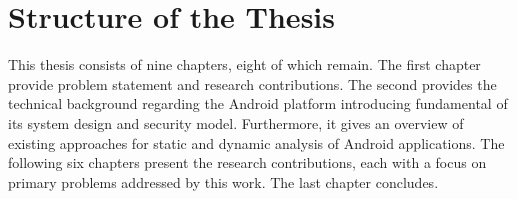 

\section{Structure of the Thesis}

This thesis consists of nine chapters, eight of which remain. The first chapter provide problem statement and research contributions. The second provides the technical background regarding the Android platform introducing fundamental of its system design and security model. Furthermore, it gives an overview of existing approaches for static and dynamic analysis of Android applications. The following six chapters present the research contributions, each with a focus on primary problems addressed by this work. The last chapter concludes.